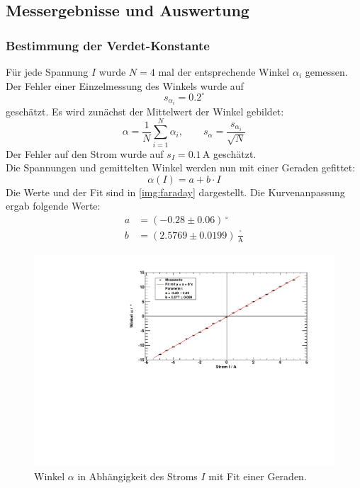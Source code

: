 \subsection{Messergebnisse und Auswertung}
\subsubsection{Bestimmung der Verdet-Konstante}
Für jede Spannung $I$ wurde $N=4$ mal der entsprechende Winkel $\alpha_i$ gemessen. Der Fehler einer Einzelmessung des Winkels wurde auf
\begin{equation}
  s_{\alpha_i} = 0.2^\circ
\end{equation}  %
geschätzt. Es wird zunächst der Mittelwert der Winkel gebildet:
\begin{equation}
  \alpha = \frac{1}{N} \sum_{i=1}^{N} \alpha_i, \qquad s_{\alpha} = \frac{s_{\alpha_i}}{\sqrt{N}}
\end{equation}
Der Fehler auf den Strom wurde auf $s_I = 0.1$\,A geschätzt.\\
Die Spannungen und gemittelten Winkel werden nun mit einer Geraden gefittet:
\begin{equation}
  \alpha(I) = a + b \cdot I
\end{equation}
Die Werte und der Fit sind in \autoref{img:faraday} dargestellt. Die Kurvenanpassung ergab folgende Werte:
\begin{equation}
\begin{split}
  \label{eq:faraday:params}
  a &= (-0.28 \pm 0.06)\,{}^\circ \\
  b &= (2.5769 \pm 0.0199)\,\frac{{}^\circ}{\text{A}}
\end{split}
\end{equation}
\begin{figure}[H]
\begin{center}
  \includegraphics[width=\textwidth]{../img/faraday.pdf}
  \caption{Winkel $\alpha$ in Abhängigkeit des Stroms $I$ mit Fit einer Geraden.}
  \label{img:faraday}
\end{center}
\end{figure}
